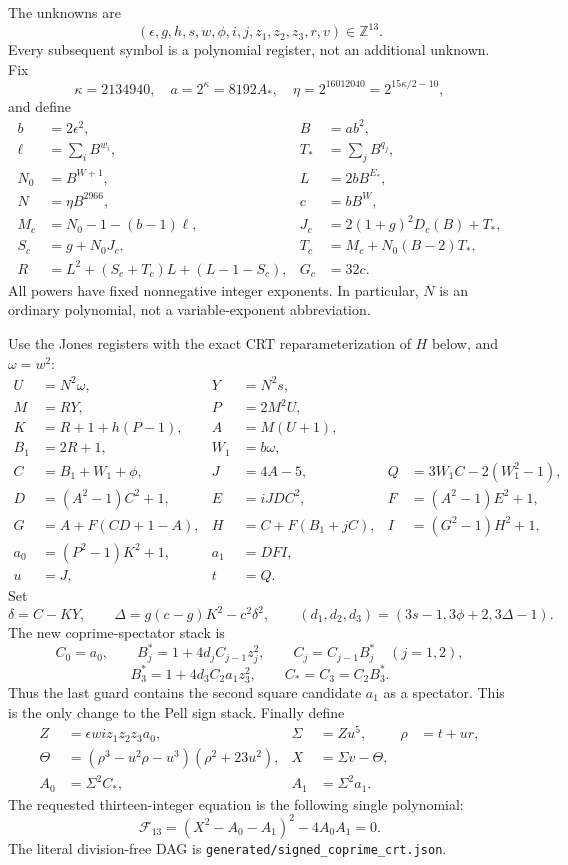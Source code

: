 The unknowns are
\[
 (\epsilon,g,h,s,w,\phi,i,j,z_1,z_2,z_3,r,v)\in\mathbb Z^{13}.
\]
Every subsequent symbol is a polynomial register, not an additional unknown.
Fix
\[
 \kappa=2134940,\quad a=2^\kappa=8192A_*,\quad
 \eta=2^{16012040}=2^{15\kappa/2-10},
\]
and define
\begin{align*}
 b&=2\epsilon^2,& B&=ab^2,\\
 \ell&=\sum_iB^{w_i},& T_*&=\sum_jB^{q_j},\\
 N_0&=B^{W+1},& L&=2bB^{E_*},\\
 N&=\eta B^{2966},& c&=bB^W,\\
 M_c&=N_0-1-(b-1)\ell,&
 J_c&=2(1+g)^2D_c(B)+T_*,\\
 S_c&=g+N_0J_c,& T_c&=M_c+N_0(B-2)T_*,\\
 R&=L^2+(S_c+T_c)L+(L-1-S_c),& G_c&=32c.
\end{align*}
All powers have fixed nonnegative integer exponents. In particular, $N$ is
an ordinary polynomial, not a variable-exponent abbreviation.

Use the Jones registers with the exact CRT reparameterization of $H$ below, and $\omega=w^2$:
\begin{align*}
 U&=N^2\omega,&Y&=N^2s,\\
 M&=RY,&P&=2M^2U,\\
 K&=R+1+h(P-1),&A&=M(U+1),\\
 B_1&=2R+1,&W_1&=b\omega,\\
 C&=B_1+W_1+\phi,&J&=4A-5,&
 Q&=3W_1C-2(W_1^2-1),\\
 D&=(A^2-1)C^2+1,&E&=iJDC^2,&F&=(A^2-1)E^2+1,\\
 G&=A+F(CD+1-A),&H&=C+F(B_1+jC),&I&=(G^2-1)H^2+1,\\
 a_0&=(P^2-1)K^2+1,&a_1&=DFI,\\
 u&=J,&t&=Q.
\end{align*}
Set
\[
 \delta=C-KY,\qquad \Delta=g(c-g)K^2-c^2\delta^2,
 \qquad (d_1,d_2,d_3)=(3s-1,3\phi+2,3\Delta-1).
\]
The new coprime-spectator stack is
\[
 C_0=a_0,\qquad B_j^*=1+4d_jC_{j-1}z_j^2,\qquad
 C_j=C_{j-1}B_j^*\quad(j=1,2),
\]
\[
 B_3^*=1+4d_3C_2a_1z_3^2,\qquad C_*=C_3=C_2B_3^*.
\]
Thus the last guard contains the second square candidate $a_1$ as a
spectator. This is the only change to the Pell sign stack.
Finally define
\begin{align*}
 Z&=\epsilon wi z_1z_2z_3a_0,&\Sigma&=Zu^5,&\rho&=t+ur,\\
 \Theta&=(\rho^3-u^2\rho-u^3)(\rho^2+23u^2),&
 X&=\Sigma v-\Theta,\\
 A_0&=\Sigma^2C_*,&A_1&=\Sigma^2a_1.
\end{align*}
The requested thirteen-integer equation is the following single polynomial:
\begin{equation}\label{eq:jones-seeded}
 \boxed{\mathcal F_{13}=(X^2-A_0-A_1)^2-4A_0A_1=0.}
\end{equation}
The literal division-free DAG is \texttt{generated/signed\_coprime\_crt.json}.

